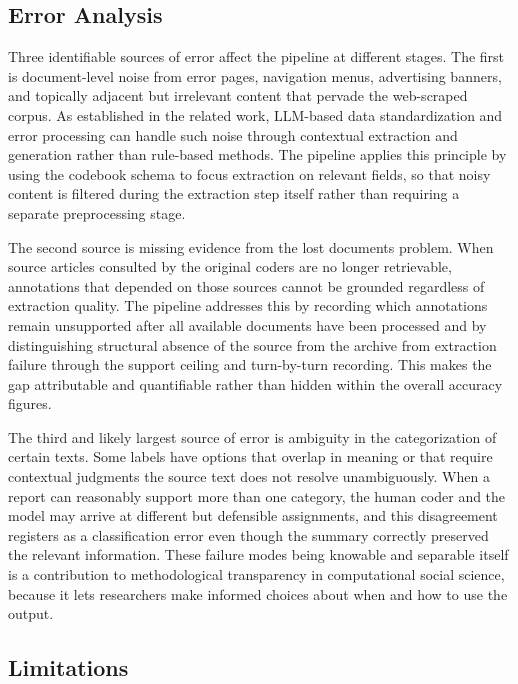 \documentclass{article}
\begin{document}
\subsection{Error Analysis}\label{error-analysis}

Three identifiable sources of error affect the pipeline at different stages. The first is document-level noise from error pages, navigation menus, advertising banners, and topically adjacent but irrelevant content that pervade the web-scraped corpus. As established in the related work, LLM-based data standardization and error processing can handle such noise through contextual extraction and generation rather than rule-based methods. The pipeline applies this principle by using the codebook schema to focus extraction on relevant fields, so that noisy content is filtered during the extraction step itself rather than requiring a separate preprocessing stage.

The second source is missing evidence from the lost documents problem. When source articles consulted by the original coders are no longer retrievable, annotations that depended on those sources cannot be grounded regardless of extraction quality. The pipeline addresses this by recording which annotations remain unsupported after all available documents have been processed and by distinguishing structural absence of the source from the archive from extraction failure through the support ceiling and turn-by-turn recording. This makes the gap attributable and quantifiable rather than hidden within the overall accuracy figures.

The third and likely largest source of error is ambiguity in the categorization of certain texts. Some labels have options that overlap in meaning or that require contextual judgments the source text does not resolve unambiguously. When a report can reasonably support more than one category, the human coder and the model may arrive at different but defensible assignments, and this disagreement registers as a classification error even though the summary correctly preserved the relevant information. These failure modes being knowable and separable itself is a contribution to methodological transparency in computational social science, because it lets researchers make informed choices about when and how to use the output.

\subsection{Limitations}\label{limitations}
\end{document}
